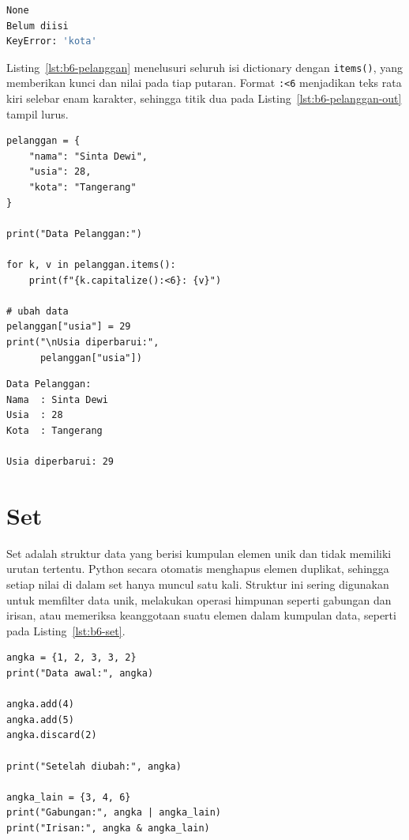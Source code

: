 \begin{lstlisting}[language=bash, caption={Keluaran dictionary_get.py}, label={lst:b6-dict-get-out}]
None
Belum diisi
KeyError: 'kota'
\end{lstlisting}

Listing~\ref{lst:b6-pelanggan} menelusuri seluruh isi dictionary dengan \texttt{items()}, yang memberikan kunci dan nilai pada tiap putaran. Format \texttt{:<6} menjadikan teks rata kiri selebar enam karakter, sehingga titik dua pada Listing~\ref{lst:b6-pelanggan-out} tampil lurus.


\begin{lstlisting}[style=PythonStyle, caption={Menampilkan data pelanggan dari dictionary}, label={lst:b6-pelanggan}]
pelanggan = {
    "nama": "Sinta Dewi",
    "usia": 28,
    "kota": "Tangerang"
}

print("Data Pelanggan:")

for k, v in pelanggan.items():
    print(f"{k.capitalize():<6}: {v}")

# ubah data
pelanggan["usia"] = 29
print("\nUsia diperbarui:",
      pelanggan["usia"])
\end{lstlisting}

\begin{lstlisting}[language=bash, caption={Keluaran kode data pelanggan}, label={lst:b6-pelanggan-out}]
Data Pelanggan:
Nama  : Sinta Dewi
Usia  : 28
Kota  : Tangerang

Usia diperbarui: 29
\end{lstlisting}

\section{Set}
Set adalah struktur data yang berisi kumpulan elemen unik dan tidak memiliki urutan tertentu. 
Python secara otomatis menghapus elemen duplikat, sehingga setiap nilai di dalam set hanya muncul satu kali. 
Struktur ini sering digunakan untuk memfilter data unik, melakukan operasi himpunan seperti gabungan dan irisan, 
atau memeriksa keanggotaan suatu elemen dalam kumpulan data, seperti pada Listing~\ref{lst:b6-set}.

\begin{lstlisting}[style=PythonStyle, caption={Operasi dasar pada set}, label={lst:b6-set}]
angka = {1, 2, 3, 3, 2}
print("Data awal:", angka)

angka.add(4)
angka.add(5)
angka.discard(2)

print("Setelah diubah:", angka)

angka_lain = {3, 4, 6}
print("Gabungan:", angka | angka_lain)
print("Irisan:", angka & angka_lain)
\end{lstlisting}

